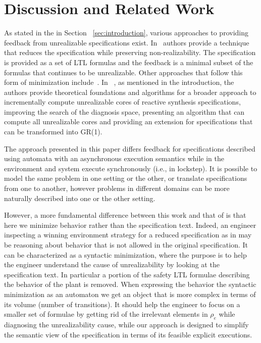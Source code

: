 \section{Discussion and Related Work}\label{sec:discussion}

As stated in the in Section ~\ref{sec:introduction}, various approaches to providing feedback from unrealizable specifications exist. In~\cite{DBLP:conf/fmcad/KonighoferHB09} authors provide a technique that reduces the specification while preserving non-realizability. The specification is provided as a set of LTL formulas and the feedback is a minimal subset of the formulas that continues to be unrealizable. Other approaches that follow this form of minimization include~\cite{DBLP:journals/scp/Schuppan12}. In ~\cite{maoz2021unrealizable}, as mentioned in the introduction, the authors provide theoretical foundations and algorithms for a broader approach to incrementally compute unrealizable cores of reactive synthesis specifications, improving the search of the diagnosis space, presenting an algorithm that can compute all unrealizable cores and providing an extension for specifications that can be transformed into GR(1).
 
The approach presented in this paper differs feedback for specifications described using automata with an asynchronous execution semantics while in \cite{DBLP:conf/fmcad/KonighoferHB09} the environment and system execute synchronously (i.e., in lockstep). It is possible to model the same problem in one setting or the other, or translate specifications from one to another, however problems in different domains can  be more naturally described into one or the other setting.

However, a more fundamental difference between this work and that of \cite{DBLP:conf/fmcad/KonighoferHB09} is that here we minimize behavior rather than the specification text. Indeed, an engineer inspecting a winning environment strategy for a reduced specification as in \cite{DBLP:conf/fmcad/KonighoferHB09} may be reasoning about behavior that is not allowed in the original specification.  It can be characterized as a syntactic minimization, where the purpose is to help the engineer understand the cause of unrealizability by looking at the specification text. In particular a portion of the safety LTL formulae describing the behavior of the plant is removed. 
When expressing the behavior the syntactic minimization as an automaton we get an object that is more complex in terms of its volume (number of transitions). 
It should help the engineer to focus on a smaller set of formulae by getting rid of the irrelevant elements in $\rho_e$ while diagnosing the unrealizability cause, while
our approach is designed to simplify the semantic view of the specification in terms of its feasible explicit executions.

